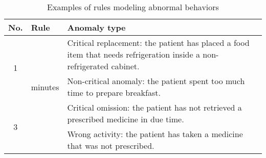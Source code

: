 \documentclass[10pt, conference, compsocconf]{IEEEtran}
\begin{document}
\begin{table*}[t!]
\caption{Examples of rules modeling abnormal behaviors}
\label{tbl:rules-examples}
\centering
\begin{tabular}{|c|p{9cm}|p{5cm}|}
\hline
 No. & Rule & Anomaly type \\
\hline
\multirow{2}{*}{1} &  &
 Critical replacement: the patient has placed a food item that needs refrigeration inside a non-refrigerated cabinet.\\
\hline
 \multirow{2}{*}{2} & minutes 
 & Non-critical anomaly: the patient spent too much time to prepare breakfast.\\
\hline
 \multirow{2}{*}{3} &  
 & Critical omission: the patient has not retrieved a prescribed medicine in due time.\\
\hline
\multirow{2}{*}{4} &  
 & Wrong activity: the patient has taken a medicine that was not prescribed.\\
\hline
\end{tabular}
\end{table*}
\end{document}
